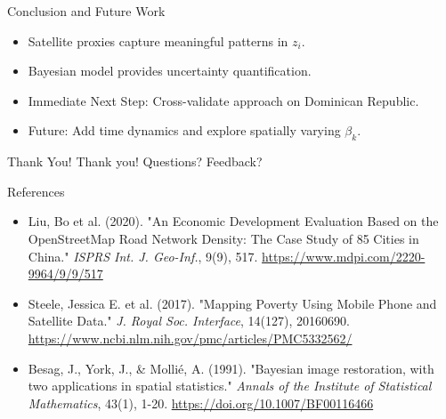 \documentclass{beamer}
\begin{document}
\begin{frame}{Conclusion and Future Work}
  \begin{itemize}
    \item Satellite proxies capture meaningful patterns in $z_i$.
    \item Bayesian model provides uncertainty quantification.
    \item Immediate Next Step: Cross-validate approach on Dominican Republic.
    \item Future: Add time dynamics and explore spatially varying $\beta_k$.
  \end{itemize}
  \end{frame}
  
\begin{frame}{Thank You!}
  \centering
  \Large
  Thank you! 
  Questions? Feedback?
\end{frame}

\begin{frame}{References}
  \begin{itemize}
    \item Liu, Bo et al. (2020). "An Economic Development Evaluation Based on the OpenStreetMap Road Network Density: The Case Study of 85 Cities in China." \textit{ISPRS Int. J. Geo-Inf.}, 9(9), 517. \href{https://www.mdpi.com/2220-9964/9/9/517}{https://www.mdpi.com/2220-9964/9/9/517}
    \item Steele, Jessica E. et al. (2017). "Mapping Poverty Using Mobile Phone and Satellite Data." \textit{J. Royal Soc. Interface}, 14(127), 20160690. \href{https://www.ncbi.nlm.nih.gov/pmc/articles/PMC5332562/}{https://www.ncbi.nlm.nih.gov/pmc/articles/PMC5332562/}
    \item Besag, J., York, J., \& Mollié, A. (1991). "Bayesian image restoration, with two applications in spatial statistics." \textit{Annals of the Institute of Statistical Mathematics}, 43(1), 1-20. \href{https://doi.org/10.1007/BF00116466}{https://doi.org/10.1007/BF00116466}
  \end{itemize}
  \end{frame}
\end{document}
